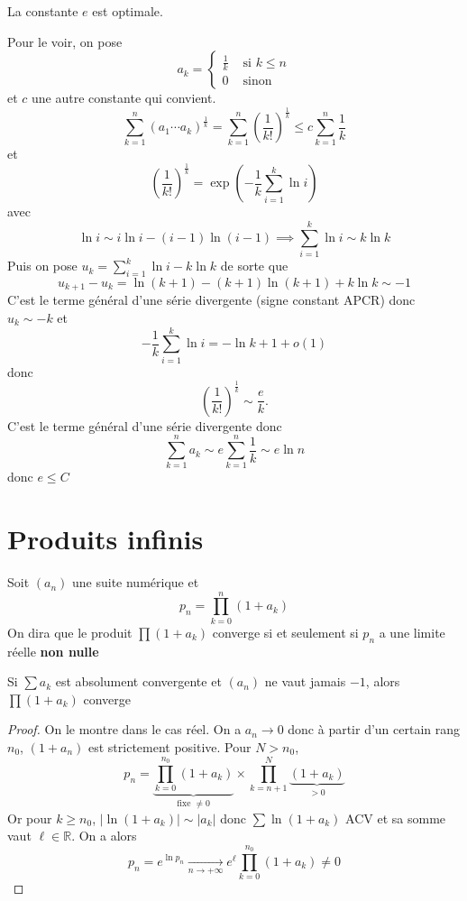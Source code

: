 \begin{rem}
    La constante $e$ est optimale.
\end{rem}

Pour le voir, on pose \[
    a_k= \begin{cases}
        \frac1k&\text{ si }k\leq n\\ 0&\text{ sinon }
    \end{cases}
\]
et $c$ une autre constante qui convient. \[
    \sum_{k=1}^n(a_1\cdots a_k)^{\frac 1k}=\sum_{k=1}^n \left( \frac1{k!} \right)^{\frac1k}\leq c\sum_{k=1}^n\frac1k
\]
et \[
    \left( \frac1{k!} \right)^{\frac1k}=\exp \left( -\frac1k\sum_{i=1}^k\ln i \right)
\]
avec \[
    \ln i\sim i\ln i-(i-1)\ln (i-1) \implies \sum_{i=1}^k\ln i\sim k\ln k
\]
Puis on pose $\displaystyle u_k=\sum_{i=1}^k\ln i-k\ln k$ de sorte que \[
    u_{k+1}-u_k=\ln(k+1)-(k+1)\ln(k+1)+k\ln k\sim -1
\]
C'est le terme général d'une série divergente (signe constant APCR) donc $u_k\sim -k$ et \[
    -\frac1k\sum_{i=1}^k\ln i=-\ln k+1+o(1)
\]
donc \[
    \left( \frac1{k!} \right)^{\frac1k}\sim \frac ek.
\]
C'est le terme général d'une série divergente donc \[
    \sum_{k=1}^n a_k\sim e\sum_{k=1}^n\frac1k\sim e\ln n
\]
donc $e\leq C$

\section{Produits infinis}

Soit $(a_n)$ une suite numérique et \[
    p_n=\prod_{k=0}^n(1+a_k)
\]
On dira que le produit $\prod(1+a_k)$ converge si et seulement si $p_n$ a une limite réelle \textbf{non nulle}

\begin{res}
    Si $\sum a_k$ est absolument convergente et $(a_n)$ ne vaut jamais $-1$, alors $\prod(1+a_k)$ converge
\end{res}

\begin{proof}
    On le montre dans le cas réel. On a $a_n\longrightarrow 0$ donc à partir d'un certain rang $n_0$, $(1+a_n)$ est strictement positive. Pour $N>n_0$, \[
        p_n=\underbrace{\prod_{k=0}^{n_0}(1+a_k)}_{\text{fixe } \neq 0}\times \prod_{k=n+1}^{N}\underbrace{(1+a_k)}_{>0}
    \]
    Or pour $k\geq n_0$, $|\ln(1+a_k)|\sim |a_k|$ donc $\sum \ln(1+a_k)$ ACV et sa somme vaut $\ell\in\mathbb R$. On a alors \[
        p_n=e^{\ln p_n}\xrightarrow[n\to+\infty]{}e^\ell \prod_{k=0}^{n_0}(1+a_k) \neq 0
    \]
\end{proof}

